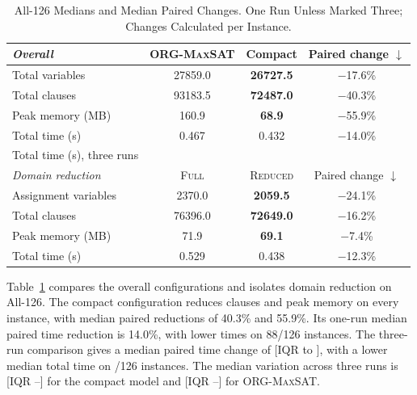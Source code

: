 \documentclass[conference,a4paper]{IEEEtran}
\newcommand{\revised}[1]{#1}
\begin{document}
\begin{table}[t]
\caption{\revised{All-126 Medians and Median Paired Changes. One Run Unless Marked Three; Changes Calculated per Instance.}}
\label{tab:compactness}
\centering
\scriptsize
\setlength{\tabcolsep}{2.7pt}
\begin{tabular}{@{}lccc@{}}
\toprule
\emph{Overall} & \mbox{\textsc{ORG-MaxSAT}} & Compact & \revised{Paired change $\downarrow$} \\
\midrule
Total variables & 27859.0 &
  \textbf{26727.5} & \ensuremath{-}17.6\% \\
Total clauses & 93183.5 &
  \textbf{72487.0} & \ensuremath{-}40.3\% \\
Peak memory (MB) & 160.9 &
  \textbf{68.9} & \ensuremath{-}55.9\% \\
Total time (s) & 0.467 &
  0.432 & \ensuremath{-}14.0\% \\
\revised{Total time (s), three runs} & \revised{\ArchiveOrgTime} &
  \revised{\ArchiveCompactTime} & \revised{\ArchiveTimeChange} \\
\addlinespace[1pt]
\emph{Domain reduction} & \mbox{\textsc{Full}} & \mbox{\textsc{Reduced}} & \revised{Paired change $\downarrow$} \\
\midrule
Assignment variables & 2370.0 &
  \textbf{2059.5} & \ensuremath{-}24.1\% \\
Total clauses & 76396.0 &
  \textbf{72649.0} & \ensuremath{-}16.2\% \\
Peak memory (MB) & 71.9 &
  \textbf{69.1} & \ensuremath{-}7.4\% \\
Total time (s) & 0.529 &
  0.438 & \ensuremath{-}12.3\% \\
\bottomrule
\end{tabular}
\end{table}
\revised{Table~\ref{tab:compactness} compares the overall configurations and isolates domain reduction on All-126.} \revised{The compact configuration reduces clauses and peak memory on every instance, with median paired reductions of 40.3\% and 55.9\%. Its one-run median paired time reduction is 14.0\%, with lower times on 88/126 instances.} \revised{The three-run comparison gives a median paired time change of \ArchiveTimeChange{} [IQR \ArchiveChangeQOne{} to \ArchiveChangeQThree{}], with a lower median total time on \ArchiveLowerCount/126 instances. The median variation across three runs is \ArchiveCompactSpan{} [IQR \ArchiveCompactSpanQOne{}--\ArchiveCompactSpanQThree{}] for the compact model and \ArchiveOrgSpan{} [IQR \ArchiveOrgSpanQOne{}--\ArchiveOrgSpanQThree{}] for \mbox{\textsc{ORG-MaxSAT}}.}
\end{document}
